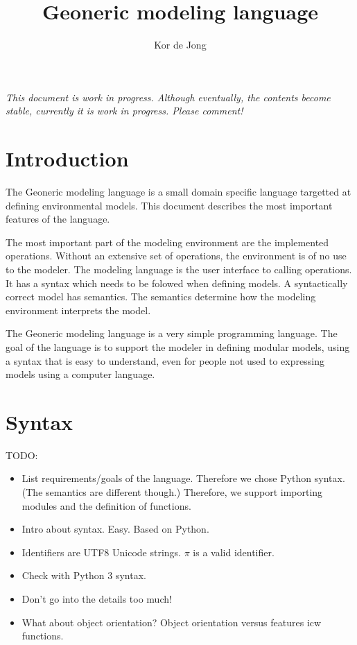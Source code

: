 \documentclass[10pt, a4paper]{article}
\begin{document}
\title{Geoneric modeling language}
\author{Kor de Jong}
\maketitle

\emph{This document is work in progress. Although eventually, the contents become stable, currently it is work in progress. Please comment!}

\section{Introduction}
The Geoneric modeling language is a small domain specific language targetted at defining environmental models. This document describes the most important features of the language.

The most important part of the modeling environment are the implemented operations. Without an extensive set of operations, the environment is of no use to the modeler. The modeling language is the user interface to calling operations. It has a syntax which needs to be folowed when defining models. A syntactically correct model has semantics. The semantics determine how the modeling environment interprets the model.

The Geoneric modeling language is a very simple programming language. The goal of the language is to support the modeler in defining modular models, using a syntax that is easy to understand, even for people not used to expressing models using a computer language.

\section{Syntax}
TODO:

\begin{itemize}
    \item List requirements/goals of the language. Therefore we chose Python syntax. (The semantics are different though.) Therefore, we support importing modules and the definition of functions.
    \item Intro about syntax. Easy. Based on Python.
    \item Identifiers are UTF8 Unicode strings. $\pi$ is a valid identifier.
    \item Check with Python 3 syntax.
    \item Don't go into the details too much!
    \item What about object orientation? Object orientation versus features icw functions.
\end{itemize}
\end{document}
